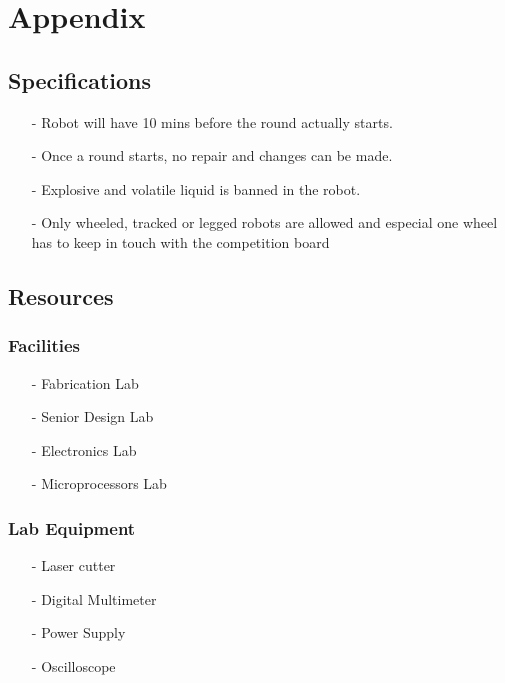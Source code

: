 \documentclass[12pt]{article}
\begin{document}
\section{Appendix}

\subsection{Specifications}

\begin{itemize}[noitemsep]
	\item[-] Robot will have 10 mins before the round actually starts.
	\item[-] Once a round starts, no repair and changes can be made. 
	\item[-] Explosive and volatile liquid is banned in the robot.
	\item[-] Only wheeled, tracked or legged robots are allowed and especial one wheel has to keep in touch with the competition board
\end{itemize}

\subsection{Resources}

\subsubsection{Facilities}

\begin{itemize}[nolistsep, noitemsep]
	\item[-] Fabrication Lab
	\item[-] Senior Design Lab
	\item[-] Electronics Lab
	\item[-] Microprocessors Lab
\end{itemize}

\subsubsection{Lab Equipment}

\begin{itemize}[noitemsep]
	\item[-] Laser cutter
	\item[-] Digital Multimeter
	\item[-] Power Supply
	\item[-] Oscilloscope
\end{itemize}
\end{document}
